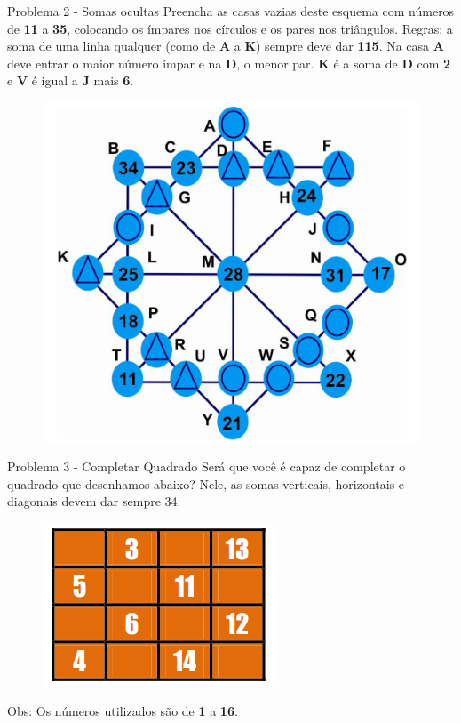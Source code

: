 \documentclass[aspectratio=169,xcolor=dvipsnames]{beamer}
\begin{document}
\begin{frame}{Problema 2 - Somas ocultas}
    Preencha as casas vazias deste esquema com números de \textbf{11} a \textbf{35},
    colocando os ímpares nos círculos e os pares nos triângulos. Regras: a soma
    de uma linha qualquer (como de \textbf{A} a \textbf{K}) sempre deve dar \textbf{115}.
    Na casa \textbf{A} deve entrar o maior número ímpar e na \textbf{D}, o menor par.
    \textbf{K} é a soma de \textbf{D} com \textbf{2} e \textbf{V} é igual a
    \textbf{J} mais \textbf{6}.

  \begin{figure}[htb!]
    \centering
    \includegraphics[width=.4\linewidth]{images/soma-oculta.png}
  \end{figure}

\end{frame}


\begin{frame}{Problema 3 - Completar Quadrado}
    Será que você é capaz de completar o quadrado que desenhamos abaixo?
    Nele, as somas verticais, horizontais e diagonais devem dar sempre 34.

  \begin{figure}[htb!]
    \centering
    \includegraphics[width=.4\linewidth]{images/quadrado.png}
  \end{figure}

  Obs: Os números utilizados são de \textbf{1} a \textbf{16}.
\end{frame}

\end{document}

